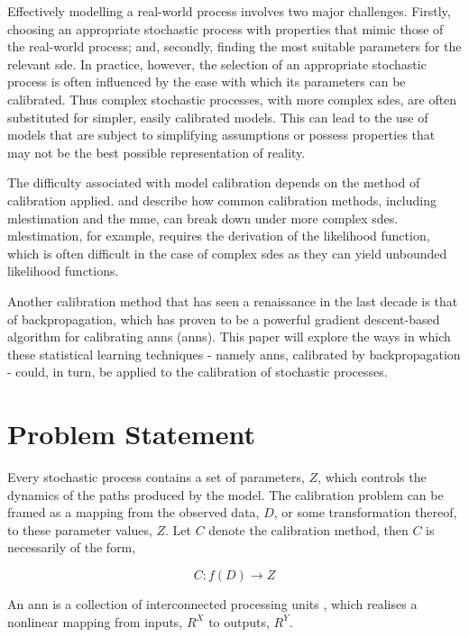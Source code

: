 \documentclass[11pt,oneside,openany,a4paper,english, report, goldenblock
]{usthesis}
\begin{document}
Effectively modelling a real-world process involves two major challenges. Firstly, choosing an appropriate stochastic process with properties that mimic those of the real-world process; and, secondly, finding the most suitable parameters for the relevant \acrshort{sde}. In practice, however, the selection of an appropriate stochastic process is often influenced by the ease with which its parameters can be calibrated. Thus complex stochastic processes, with more complex \acrshort{sde}s, are often substituted for simpler, easily calibrated models. This can lead to the use of models that are subject to simplifying assumptions or possess properties that may not be the best possible representation of reality.


The difficulty associated with model calibration depends on the method of calibration applied. \citet{Mongwe} and \citet{Honore} describe how common calibration methods, including \acrfull{mlestimation} and the \acrfull{mme}, can break down under more complex \acrshort{sde}s. \acrshort{mlestimation}, for example, requires the derivation of the likelihood function, which is often difficult in the case of complex \acrshort{sde}s as they can yield unbounded likelihood functions.


Another calibration method that has seen a renaissance in the last decade is that of backpropagation, which has proven to be a powerful gradient descent-based algorithm for calibrating \acrlong{ann}s (\acrshort{ann}s). 
This paper will explore the ways in which these statistical learning techniques - namely \acrshort{ann}s, calibrated by backpropagation - could, in turn, be applied to the calibration of stochastic processes.



\section{Problem Statement}
Every stochastic process contains a set of parameters, $ Z $, which controls the dynamics of the paths produced by the model. The calibration problem can be framed as a mapping from the observed data, $ D $, or some transformation thereof, to these parameter values, $ Z $. Let $C$ denote the calibration method, then $C$ is necessarily of the form,

\begin{equation}
C:f \left( D \right) \rightarrow Z
\end{equation}

An \acrshort{ann} is a collection of interconnected processing units \citep{Teugels}, which realises a nonlinear mapping from inputs, $ R^X $ to outputs, $ R^Y $.
\end{document}
